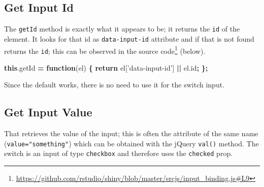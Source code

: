 \documentclass[10pt,]{krantz}
\makeatletter
\newenvironment{Shaded}{\begin{snugshade}}{\end{snugshade}}
\newcommand{\AttributeTok}[1]{\textcolor[rgb]{0.61,0.61,0.61}{#1}}
\newcommand{\CommentTok}[1]{\textcolor[rgb]{0.37,0.37,0.37}{\textit{#1}}}
\newcommand{\ControlFlowTok}[1]{\textcolor[rgb]{0.27,0.27,0.27}{\textbf{#1}}}
\newcommand{\DataTypeTok}[1]{\textcolor[rgb]{0.27,0.27,0.27}{#1}}
\newcommand{\KeywordTok}[1]{\textcolor[rgb]{0.27,0.27,0.27}{\textbf{#1}}}
\newcommand{\NormalTok}[1]{#1}
\newcommand{\OperatorTok}[1]{\textcolor[rgb]{0.43,0.43,0.43}{\textbf{#1}}}
\newcommand{\StringTok}[1]{\textcolor[rgb]{0.5,0.5,0.5}{#1}}
\newcommand{\VariableTok}[1]{\textcolor[rgb]{0,0,0}{#1}}
\renewcommand{\href}[2]{#2\footnote{\url{#1}}}
\newenvironment{kframe}{%
\medskip{}
\setlength{\fboxsep}{.8em}
 \def\at@end@of@kframe{}%
 \ifinner\ifhmode%
  \def\at@end@of@kframe{\end{minipage}}%
  \begin{minipage}{\columnwidth}%
 \fi\fi%
 \def\FrameCommand##1{\hskip\@totalleftmargin \hskip-\fboxsep
 \colorbox{shadecolor}{##1}\hskip-\fboxsep
     \hskip-\linewidth \hskip-\@totalleftmargin \hskip\columnwidth}%
 \MakeFramed {\advance\hsize-\width
   \@totalleftmargin\z@ \linewidth\hsize
   \@setminipage}}%
 {\par\unskip\endMakeFramed%
 \at@end@of@kframe}
\renewenvironment{Shaded}{\begin{kframe}}{\end{kframe}}
\makeatother
\begin{document}
\hypertarget{shiny-input-get-id}{%
\subsection{Get Input Id}\label{shiny-input-get-id}}

The \texttt{getId} method is exactly what it appears to be; it returns the \texttt{id} of the element. It looks for that id as \texttt{data-input-id} attribute and if that is not found returns the \texttt{id}; this can be observed in the \href{https://github.com/rstudio/shiny/blob/master/srcjs/input_binding.js\#L9}{source code} (below).

\begin{Shaded}
\begin{Highlighting}[]
\KeywordTok{this}\NormalTok{.}\AttributeTok{getId} \OperatorTok{=} \KeywordTok{function}\NormalTok{(el) }\OperatorTok{\{}
  \ControlFlowTok{return}\NormalTok{ el[}\StringTok{'data-input-id'}\NormalTok{] }\OperatorTok{||} \VariableTok{el}\NormalTok{.}\AttributeTok{id}\OperatorTok{;}
\OperatorTok{\};}
\end{Highlighting}
\end{Shaded}

Since the default works, there is no need to use it for the switch input.

\hypertarget{shiny-input-get-value}{%
\subsection{Get Input Value}\label{shiny-input-get-value}}

That retrieves the value of the input; this is often the attribute of the same name (\texttt{value="something"}) which can be obtained with the jQuery \texttt{val()} method. The switch is an input of type \texttt{checkbox} and therefore uses the \texttt{checked} prop.

\begin{Shaded}
\end{Shaded}
\end{document}
